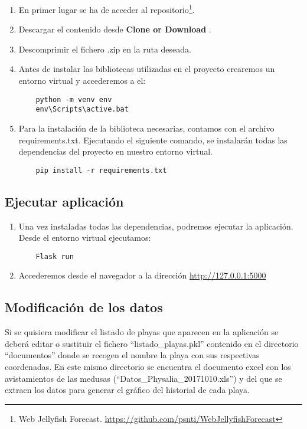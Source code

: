 \begin{enumerate}
	\item En primer lugar se ha de acceder al repositorio\footnote{Web Jellyfish Forecast. \url{https://github.com/psnti/WebJellyfishForecast}}.
	\item Descargar el contenido desde \textbf{Clone or Download}
	\label{clone}.
	\item Descomprimir el fichero .zip en la ruta deseada.
	\item Antes de instalar las bibliotecas utilizadas en el proyecto crearemos un entorno virtual y accederemos a el:
	\begin{verbatim}
	python -m venv env
	env\Scripts\active.bat
	\end{verbatim}
	\item Para la instalación de la biblioteca necesarias, contamos con el archivo requirements.txt. Ejecutando el siguiente comando, se instalarán todas las dependencias del proyecto en  nuestro entorno virtual.
	\begin{verbatim}
	pip install -r requirements.txt
	\end{verbatim}
	
\end{enumerate}

\subsection{Ejecutar aplicación}

\begin{enumerate}
	\item Una vez instaladas todas las dependencias, podremos ejecutar la aplicación. Desde el entorno virtual ejecutamos:
	\begin{verbatim}
	Flask run
	\end{verbatim}
	\item Accederemos desde el navegador a la dirección \href{http://127.0.0.1:5000}{http://127.0.0.1:5000}
	
\end{enumerate}

\subsection{Modificación de los datos}

Si se quisiera modificar el listado de playas que aparecen en la aplicación se deberá editar o sustituir el fichero ``listado\_playas.pkl'' contenido en el directorio ``documentos'' donde se recogen el nombre la playa con sus respectivas coordenadas. En este mismo directorio se encuentra el documento excel con los avistamientos de las medusas (``Datos\_Physalia\_20171010.xls'') y del que se extraen los datos para generar el gráfico del historial de cada playa. 

